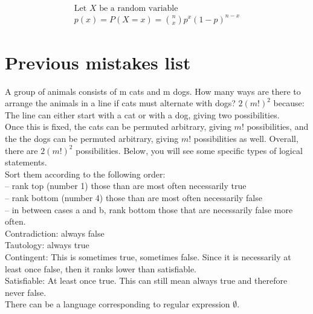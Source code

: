 \documentclass{article}
\begin{document}
\begin{align*}
    \text{Let } X \text{ be a random variable} \\
    p(x) = P(X = x) = \binom{n}{x} p^x (1 - p)^{n - x}
\end{align*}

\section{Previous mistakes list}

\begin{outline}
    \1 A group of animals consists of m cats and m dogs. How many ways are there to arrange the animals in a line if cats must alternate with dogs?
        \2 $2(m!)^2$ because: The line can either start with a cat or with a dog, giving two possibilities. \\
    Once this is fixed, the cats can be permuted arbitrary, giving $ m! $ possibilities, and the the dogs can be permuted arbitrary, giving $ m! $ possibilities as well. Overall, there are $2(m!)^2$ possibilities.
    \1 Below, you will see some specific types of logical statements. \\
    Sort them according to the following order: \\
    -- rank top (number 1) those than are most often necessarily true \\
    -- rank bottom (number 4) those than are most often necessarily false \\
    -- in between cases a and b, rank bottom those that are necessarily false more often.\\
    \2 Contradiction: always false \\
    Tautology: always true \\
    Contingent: This is sometimes true, sometimes false. Since it is necessarily at least once false, then it ranks lower than satisfiable. \\
    Satisfiable: At least once true. This can still mean always true and therefore never false. \\
    \1 There can be a language corresponding to regular expression $ \emptyset $.
\end{outline}
\end{document}
